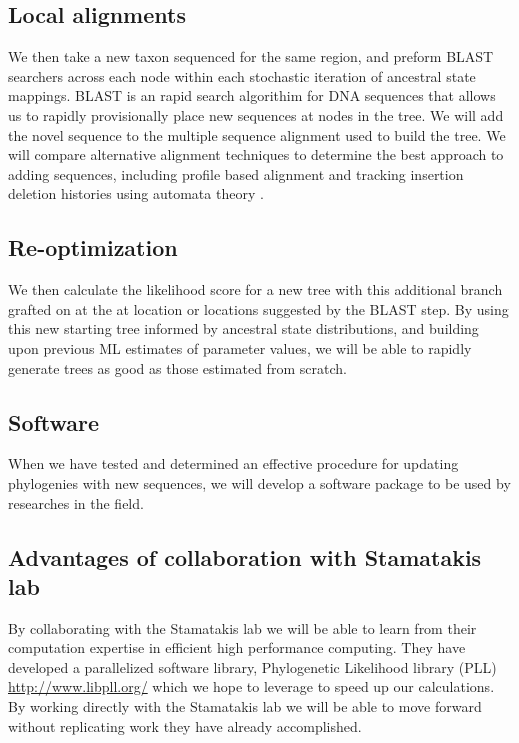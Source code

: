 \documentclass[10pt]{article}
\begin{document}
\subsection*{Local alignments}
We then take a new taxon sequenced for the same region, and preform BLAST searchers across each node within each stochastic iteration of ancestral state mappings. BLAST is an rapid search algorithim for DNA sequences that allows us to rapidly provisionally place new sequences at nodes in the tree. We will add the novel sequence to the multiple sequence alignment used to build the tree. We will compare alternative alignment techniques to determine the best approach to adding sequences, including profile based alignment \cite{loytynoja_accurate_2012} \cite{smith_mega-phylogeny_2009} and tracking insertion deletion histories using automata theory \cite{westesson_accurate_2012}.

\subsection*{Re-optimization}
We then calculate the likelihood score for a new tree with this additional branch grafted on at the at location or locations suggested by the BLAST step. By using this new starting tree informed by ancestral state distributions, and building upon previous ML estimates of parameter values, we will be able to rapidly generate trees as good as those estimated from scratch. 

\subsection*{Software}
When we have tested and determined an effective procedure for updating phylogenies with new sequences, we will develop a software package to be used by researches in the field.

\subsection*{Advantages of collaboration with Stamatakis lab}
By collaborating with the Stamatakis lab we will be able to learn from their computation expertise in efficient high performance computing. They have developed a parallelized software library, Phylogenetic Likelihood library (PLL) \url{http://www.libpll.org/} which we hope to leverage to speed up our calculations. By working directly with the Stamatakis lab we will be able to move forward without replicating work they have already accomplished.
\end{document}
